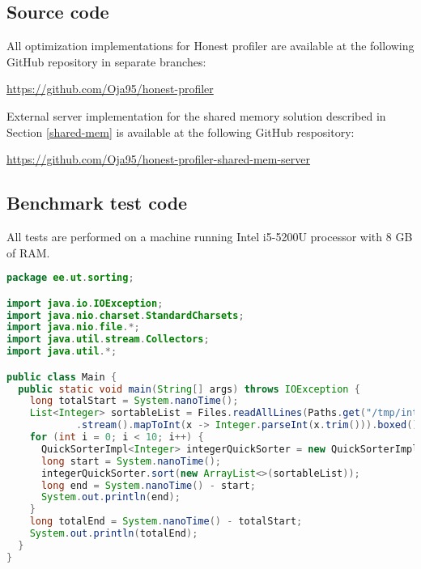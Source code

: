 \documentclass[..thesis.tex]{subfiles}
\begin{document}
\subsection{Source code}
\label{B:source-code}
All optimization implementations for Honest profiler are available at the following GitHub repository in separate branches:

\url{https://github.com/Oja95/honest-profiler}

External server implementation for the shared memory solution described in Section \ref{shared-mem} is available at the following GitHub respository:

\url{https://github.com/Oja95/honest-profiler-shared-mem-server}

\subsection{Benchmark test code}
\label{B:benchmark-test-code}
All tests are performed on a machine running Intel i5-5200U processor with 8 GB of RAM.

\begin{lstlisting}[language=Java,style=def]
package ee.ut.sorting;

import java.io.IOException;
import java.nio.charset.StandardCharsets;
import java.nio.file.*;
import java.util.stream.Collectors;
import java.util.*;

public class Main {
  public static void main(String[] args) throws IOException {
    long totalStart = System.nanoTime();
    List<Integer> sortableList = Files.readAllLines(Paths.get("/tmp/integers.data"), StandardCharsets.UTF_8)
            .stream().mapToInt(x -> Integer.parseInt(x.trim())).boxed().collect(Collectors.toList());
    for (int i = 0; i < 10; i++) {
      QuickSorterImpl<Integer> integerQuickSorter = new QuickSorterImpl<>();
      long start = System.nanoTime();
      integerQuickSorter.sort(new ArrayList<>(sortableList));
      long end = System.nanoTime() - start;
      System.out.println(end);
    }
    long totalEnd = System.nanoTime() - totalStart;
    System.out.println(totalEnd);
  }
}

\end{lstlisting}

\newpage
\end{document}
